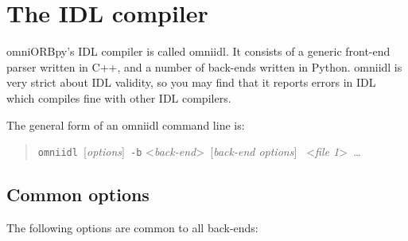 \documentclass[11pt,oneside,a4paper]{book}
\newcommand{\cmdline}[1]{\texttt{#1}}
\begin{document}
\chapter{The IDL compiler}
\label{chap:omniidl}

omniORBpy's IDL compiler is called omniidl. It consists of a generic
front-end parser written in C++, and a number of back-ends written in
Python. omniidl is very strict about IDL validity, so you may find
that it reports errors in IDL which compiles fine with other IDL
compilers.

The general form of an omniidl command line is:

\begin{quote} %
\cmdline{omniidl }[\textit{options}]\cmdline{ -b}%
<\textit{back-end}>\cmdline{ }[\textit{back-end options}]%
\cmdline{ }<\textit{file 1}>\cmdline{ }\dots
\end{quote}

\section{Common options}

The following options are common to all back-ends:
\end{document}

